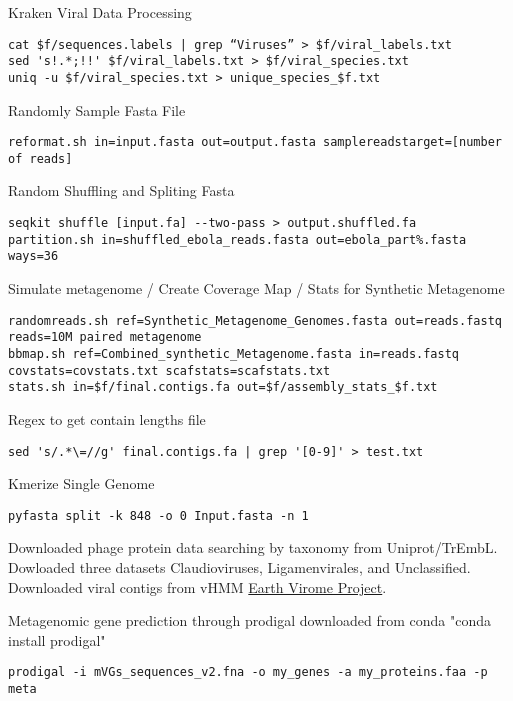 \documentclass[idxtotoc,hyperref,openany,oneside]{labbook} %
\begin{document}
Kraken Viral Data Processing
\begin{verbatim}
cat $f/sequences.labels | grep “Viruses” > $f/viral_labels.txt
sed 's!.*;!!' $f/viral_labels.txt > $f/viral_species.txt
uniq -u $f/viral_species.txt > unique_species_$f.txt 
\end{verbatim}

Randomly Sample Fasta File
\begin{verbatim}
reformat.sh in=input.fasta out=output.fasta samplereadstarget=[number of reads]
\end{verbatim}

Random Shuffling and Spliting Fasta
\begin{verbatim}
seqkit shuffle [input.fa] --two-pass > output.shuffled.fa
partition.sh in=shuffled_ebola_reads.fasta out=ebola_part%.fasta ways=36
\end{verbatim}

Simulate metagenome / Create Coverage Map / Stats for Synthetic Metagenome
\begin{verbatim}
randomreads.sh ref=Synthetic_Metagenome_Genomes.fasta out=reads.fastq reads=10M paired metagenome
bbmap.sh ref=Combined_synthetic_Metagenome.fasta in=reads.fastq covstats=covstats.txt scafstats=scafstats.txt
stats.sh in=$f/final.contigs.fa out=$f/assembly_stats_$f.txt
\end{verbatim}


Regex to get contain lengths file
\begin{verbatim}
sed 's/.*\=//g' final.contigs.fa | grep '[0-9]' > test.txt
\end{verbatim}

Kmerize Single Genome
\begin{verbatim}
pyfasta split -k 848 -o 0 Input.fasta -n 1
\end{verbatim}







Downloaded phage protein data searching by taxonomy from Uniprot/TrEmbL. Dowloaded three datasets Claudioviruses, Ligamenvirales, and Unclassified. Downloaded viral contigs from vHMM \href{http://portal.nersc.gov/dna/microbial/prokpubs/EarthVirome_DP/}{Earth Virome Project}. 

Metagenomic gene prediction through prodigal downloaded from conda "conda install prodigal"

\begin{verbatim}
prodigal -i mVGs_sequences_v2.fna -o my_genes -a my_proteins.faa -p meta
\end{verbatim}
\end{document}
